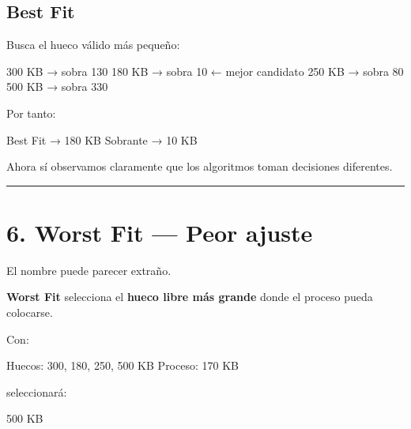 \documentclass[
  spanish,
  letterpaper,
]{scrbook}
\newenvironment{Shaded}{\begin{snugshade}}{\end{snugshade}}
\newcommand{\NormalTok}[1]{\textcolor[rgb]{0.00,0.23,0.31}{#1}}
\begin{document}
\section{Best Fit}\label{best-fit-1}

Busca el hueco válido más pequeño:

\begin{Shaded}
\begin{Highlighting}[]
\NormalTok{300 KB → sobra 130}
\NormalTok{180 KB → sobra 10   ← mejor candidato}
\NormalTok{250 KB → sobra 80}
\NormalTok{500 KB → sobra 330}
\end{Highlighting}
\end{Shaded}

Por tanto:

\begin{Shaded}
\begin{Highlighting}[]
\NormalTok{Best Fit → 180 KB}
\NormalTok{Sobrante → 10 KB}
\end{Highlighting}
\end{Shaded}

Ahora sí observamos claramente que los algoritmos toman decisiones
diferentes.

\begin{center}\rule{0.5\linewidth}{0.5pt}\end{center}


\chapter{6. Worst Fit --- Peor ajuste}\label{worst-fit-peor-ajuste}

El nombre puede parecer extraño.

\textbf{Worst Fit} selecciona el \textbf{hueco libre más grande} donde
el proceso pueda colocarse.

Con:

\begin{Shaded}
\begin{Highlighting}[]
\NormalTok{Huecos: 300, 180, 250, 500 KB}
\NormalTok{Proceso: 170 KB}
\end{Highlighting}
\end{Shaded}

seleccionará:

\begin{Shaded}
\begin{Highlighting}[]
\NormalTok{500 KB}
\end{Highlighting}
\end{Shaded}
\end{document}

